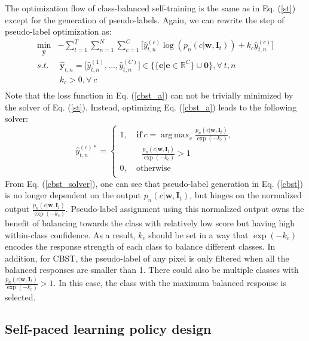 \documentclass[runningheads]{llncs}
\DeclareMathOperator*{\argmax}{arg\,max}
\begin{document}
The optimization flow of class-balanced self-training is the same as in Eq. (\ref{st}) except for the generation of pseudo-labels. Again, we can rewrite the step of pseudo-label optimization as:
\begin{equation}\label{cbst_a}
\begin{split}
\min_{\hat{\mathbf{y}}}& -\sum_{t=1}^T\sum_{n=1}^N\sum_{c=1}^C\big[\hat{y}_{t,n}^{(c)}\log(p_n(c|\mathbf{w},\mathbf{I}_t))+k_c\hat{y}_{t,n}^{(c)}\big]\\
s.t.&~\hat{\mathbf{y}}_{t,n}=\big[\hat{y}_{t,n}^{(1)},...,\hat{y}_{t,n}^{(C)}\big] \in \{\{\mathbf{e}|\mathbf{e} \in \mathbb{R}^C\} \cup \mathbf{0}\}, \forall~t,n\\
&~k_c > 0, \forall~c\\
\end{split}
\end{equation}
Note that the loss function in Eq. (\ref{cbst_a}) can not be trivially minimized by the solver of Eq. (\ref{st}). Instead, optimizing Eq. (\ref{cbst_a}) leads to the following solver:
\begin{equation}\label{cbst_solver}
\hat{y}_{t,n}^{(c)*}=\left\{
\begin{aligned}
1, &~\mathbf{if}~c=\argmax_{c}\frac{p_n(c|\mathbf{w},\mathbf{I}_t)}{\exp(-k_c)},\\ &~~~~\frac{p_n(c|\mathbf{w},\mathbf{I}_t)}{\exp(-k_c)}>1\\
0, &~\mathrm{otherwise}\\
\end{aligned}
\right.
\end{equation}
From Eq. (\ref{cbst_solver}), one can see that pseudo-label generation in Eq. (\ref{cbst}) is no longer dependent on the output $p_n(c|\mathbf{w},\mathbf{I}_t)$, but hinges on the normalized output $\frac{p_n(c|\mathbf{w},\mathbf{I}_t)}{\exp(-k_c)}$. Pseudo-label assignment using this normalized output owns the benefit of balancing towards the class with relatively low score but having high within-class confidence. As a result, $k_c$ should be set in a way that $\exp(-k_c)$ encodes the response strength of each class to balance different classes. In addition, for CBST, the pseudo-label of any pixel is only filtered when all the balanced responses are smaller than 1. There could also be multiple classes with $\frac{p_n(c|\mathbf{w},\mathbf{I}_t)}{\exp(-k_c)}>1$. In this case, the class with the maximum balanced response is selected.

\subsection{Self-paced learning policy design}
\end{document}
